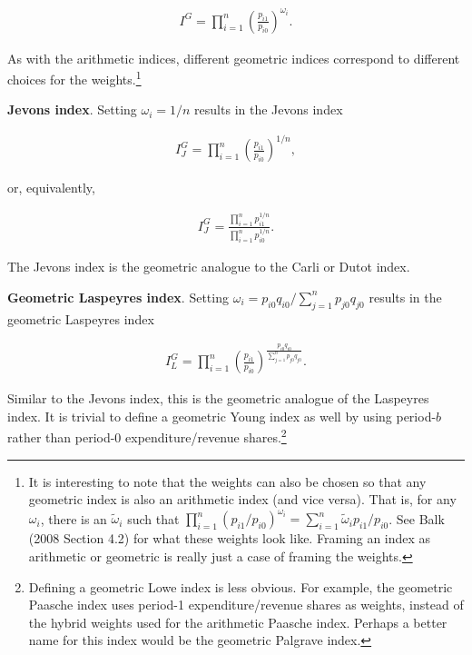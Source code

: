 \documentclass[]{article}
\begin{document}
\begin{align*}
I^{G} = \prod_{i = 1}^{n} \left(\frac{p_{i1}}{p_{i0}}\right)^{\omega_{i}}.
\end{align*}

As with the arithmetic indices, different geometric indices correspond to different choices for the weights.\footnote{It is interesting to note that the weights can also be chosen so that any geometric index is also an arithmetic index (and vice versa). That is, for any \(\omega_{i}\), there is an \(\tilde{\omega}_{i}\) such that \(\prod_{i = 1}^{n} (p_{i1} / p_{i0})^{\omega_{i}} = \sum_{i = 1}^{n} \tilde{\omega}_{i} p_{i1} / p_{i0}\). See Balk (2008 Section 4.2) for what these weights look like. Framing an index as arithmetic or geometric is really just a case of framing the weights.}

\textbf{Jevons index}. Setting \(\omega_{i} = 1 / n\) results in the Jevons index

\begin{align*}
I^{G}_{J} = \prod_{i = 1}^{n} \left(\frac{p_{i1}}{p_{i0}}\right)^{1 / n},
\end{align*}

or, equivalently,

\begin{align*}
I^{G}_{J} = \frac{\prod_{i = 1}^{n} p_{i1}^{1 / n}}{\prod_{i = 1}^{n} p_{i0}^{1 / n}}.
\end{align*}

The Jevons index is the geometric analogue to the Carli or Dutot index.

\textbf{Geometric Laspeyres index}. Setting \(\omega_{i} = p_{i0} q_{i0} / \sum_{j = 1}^{n} p_{j0} q_{j0}\) results in the geometric Laspeyres index

\begin{align*}
I^{G}_{L} = \prod_{i = 1}^{n} \left(\frac{p_{i1}}{p_{i0}}\right)^{\frac{p_{i0} q_{i0}}{\sum_{j = 1}^{n} p_{j0} q_{j0}}}.
\end{align*}

Similar to the Jevons index, this is the geometric analogue of the Laspeyres index. It is trivial to define a geometric Young index as well by using period-\(b\) rather than period-0 expenditure/revenue shares.\footnote{Defining a geometric Lowe index is less obvious. For example, the geometric Paasche index uses period-1 expenditure/revenue shares as weights, instead of the hybrid weights used for the arithmetic Paasche index. Perhaps a better name for this index would be the geometric Palgrave index.}
\end{document}
